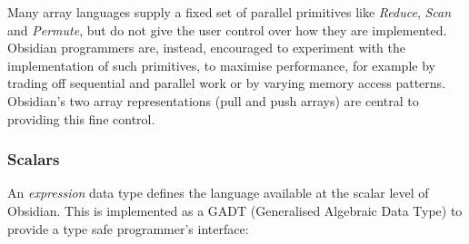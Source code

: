 

Many array languages supply a fixed set
of parallel primitives like {\em Reduce}, {\em Scan} and {\em Permute}, but
do not give the user control over how they are implemented.
Obsidian programmers are, instead, encouraged to experiment with the
implementation of such primitives, to maximise performance, for example
by trading off sequential and parallel work or by varying memory access patterns.
Obsidian's two array representations (pull and push arrays) are central to providing 
this fine control.

\subsubsection{Scalars}

An {\em expression} data type defines the language
available at the scalar level of Obsidian. This is implemented as a GADT (Generalised Algebraic Data Type) to provide a type safe 
programmer's interface: 

